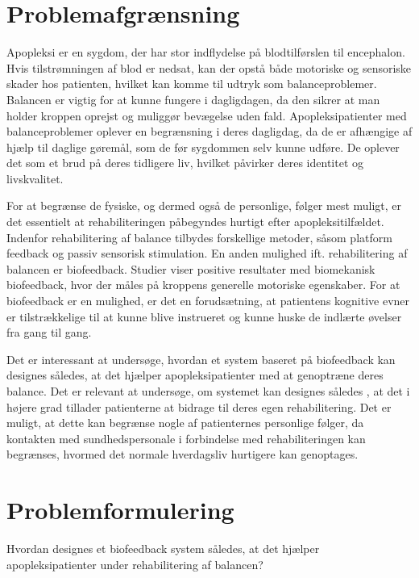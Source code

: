 \section{Problemafgrænsning}
Apopleksi er en sygdom, der har stor indflydelse på blodtilførslen til encephalon. Hvis tilstrømningen af blod er nedsat, kan der opstå både motoriske og sensoriske skader hos patienten, hvilket kan komme til udtryk som balanceproblemer. Balancen er vigtig for at kunne fungere i dagligdagen, da den sikrer at man holder kroppen oprejst og muliggør bevægelse uden fald. \cite{Nichols1997} Apopleksipatienter med balanceproblemer oplever en begrænsning i deres dagligdag, da de er afhængige af hjælp til daglige gøremål, som de før sygdommen selv kunne udføre. De oplever det som et brud på deres tidligere liv, hvilket påvirker deres identitet og livskvalitet. \cite{Sundhedsstyrelsen2010}

For at begrænse de fysiske, og dermed også de personlige, følger mest muligt, er det essentielt at rehabiliteringen påbegyndes hurtigt efter apopleksitilfældet.  Indenfor rehabilitering af balance tilbydes forskellige metoder, såsom platform feedback og passiv sensorisk stimulation. En anden mulighed ift. rehabilitering af balancen er biofeedback. Studier viser positive resultater med biomekanisk biofeedback, hvor der måles på kroppens generelle motoriske egenskaber. \cite{Giggins2013} For at biofeedback er en mulighed, er det en forudsætning, at patientens kognitive evner er tilstrækkelige til at kunne blive instrueret og kunne huske de indlærte øvelser fra gang til gang. \cite{Middaugh1989}

Det er interessant at undersøge, hvordan et system baseret på biofeedback kan designes således, at det hjælper apopleksipatienter med at genoptræne deres balance. Det er relevant at undersøge, om systemet kan designes således , at det i højere grad tillader patienterne at bidrage til deres egen rehabilitering. Det er muligt, at dette kan begrænse nogle af patienternes personlige følger, da kontakten med sundhedspersonale i forbindelse med rehabiliteringen kan begrænses, hvormed det normale hverdagsliv hurtigere kan genoptages. 

\section{Problemformulering}
Hvordan designes et biofeedback system således, at det hjælper apopleksipatienter under rehabilitering af balancen?


